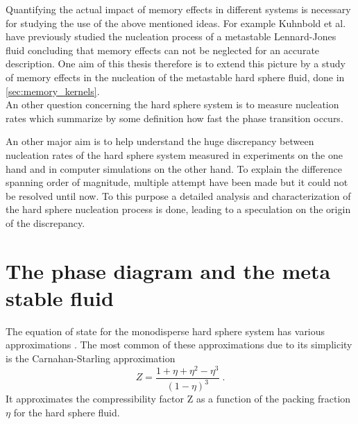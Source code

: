 Quantifying the actual impact of memory effects in different systems is necessary for studying the use of the above mentioned ideas. For example Kuhnbold et al.\cite{Kuhnbold2019} have previously studied the nucleation process of a metastable Lennard-Jones fluid concluding that memory effects can not be neglected for an accurate description. One aim of this thesis therefore is to extend this picture by a study of memory effects in the nucleation of the metastable hard sphere fluid, done in \autoref{sec:memory_kernels}.\\

An other question concerning the hard sphere system is to measure nucleation rates which summarize by some definition how fast the phase transition occurs. 

An other major aim is to help understand the huge discrepancy between nucleation rates of the hard sphere system measured in experiments on the one hand and in computer simulations on the other hand. To explain the difference spanning order of magnitude, multiple attempt have been made but it could not be resolved until now. To this purpose a detailed analysis and characterization of the hard sphere nucleation process is done, leading to a speculation on the origin of the discrepancy.\\

\section{The phase diagram and the meta stable fluid}
\label{sec:HS_phase_diagram}
The equation of state for the monodisperse hard sphere system has various approximations \cite{Mulero2001}. The most common of these approximations due to its simplicity is the Carnahan-Starling approximation\cite{Carnahan1969}
\begin{equation}
\label{eqn:CS}
Z=\frac{1+\eta+\eta^2-\eta^3}{(1-\eta)^3} \; \text{.}
\end{equation}
It approximates the compressibility factor Z as a function of the packing fraction $\eta$ for the hard sphere fluid.\\

